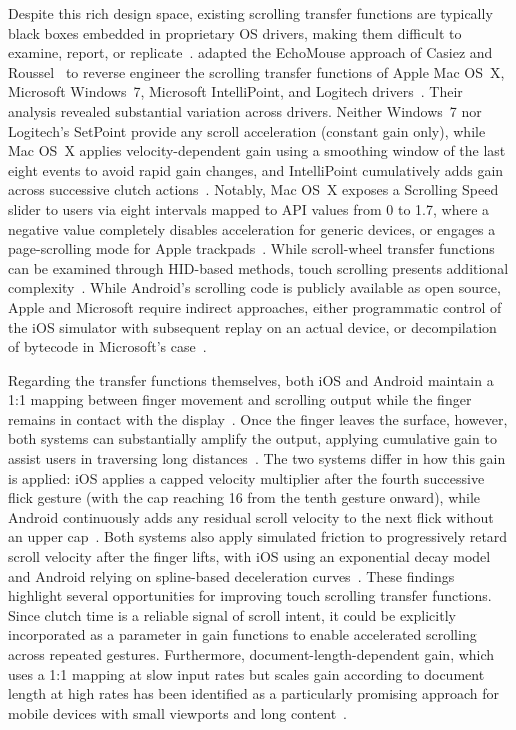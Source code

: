 Despite this rich design space, existing scrolling transfer functions are typically black boxes embedded in proprietary OS drivers, making them difficult to examine, report, or replicate~\cite{quinn2012exposing}. \citeauthor{quinn2012exposing} adapted the EchoMouse approach of Casiez and Roussel~\cite{casiez2011no} to reverse engineer the scrolling transfer functions of Apple Mac OS~X, Microsoft Windows~7, Microsoft IntelliPoint, and Logitech drivers~\cite{quinn2012exposing}. Their analysis revealed substantial variation across drivers. Neither Windows~7 nor Logitech's SetPoint provide any scroll acceleration (constant gain only), while Mac OS~X applies velocity-dependent gain using a smoothing window of the last eight events to avoid rapid gain changes, and IntelliPoint cumulatively adds gain across successive clutch actions~\cite{quinn2012exposing}. Notably, Mac OS~X exposes a Scrolling Speed slider to users via eight intervals mapped to API values from 0 to 1.7, where a negative value completely disables acceleration for generic devices, or engages a page-scrolling mode for Apple trackpads~\cite{quinn2012exposing}. While scroll-wheel transfer functions can be examined through HID-based methods, touch scrolling presents additional complexity~\cite{quinn2013touch}. While Android's scrolling code is publicly available as open source, Apple and Microsoft require indirect approaches, either programmatic control of the iOS simulator with subsequent replay on an actual device, or decompilation of bytecode in Microsoft's case~\cite{quinn2013touch}.

Regarding the transfer functions themselves, both iOS and Android maintain a 1:1 mapping between finger movement and scrolling output while the finger remains in contact with the display~\cite{quinn2013touch}. Once the finger leaves the surface, however, both systems can substantially amplify the output, applying cumulative gain to assist users in traversing long distances~\cite{quinn2013touch}. The two systems differ in how this gain is applied: iOS applies a capped velocity multiplier after the fourth successive flick gesture (with the cap reaching 16 from the tenth gesture onward), while Android continuously adds any residual scroll velocity to the next flick without an upper cap~\cite{quinn2013touch}. Both systems also apply simulated friction to progressively retard scroll velocity after the finger lifts, with iOS using an exponential decay model and Android relying on spline-based deceleration curves~\cite{quinn2013touch}. These findings highlight several opportunities for improving touch scrolling transfer functions. Since clutch time is a reliable signal of scroll intent, it could be explicitly incorporated as a parameter in gain functions to enable accelerated scrolling across repeated gestures. Furthermore, document-length-dependent gain, which uses a 1:1 mapping at slow input rates but scales gain according to document length at high rates has been identified as a particularly promising approach for mobile devices with small viewports and long content~\cite{quinn2013touch}.

